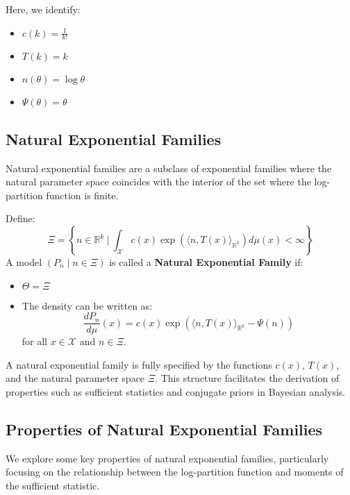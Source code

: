 \documentclass[open=any, 11pt,paper=A4]{scrreprt}
\begin{document}
Here, we identify:
\begin{itemize}
    \item \(c(k) = \frac{1}{k!}\)
    \item \(T(k) = k\)
    \item \(n(\theta) = \log \theta\)
    \item \(\Psi(\theta) = \theta\)
\end{itemize}

\subsection*{Natural Exponential Families}

Natural exponential families are a subclass of exponential families where the natural parameter space coincides with the interior of the set where the log-partition function is finite.

\begin{definition}
    Define:
    \[
    \Xi = \left\{ n \in \mathbb{R}^k \ \bigg| \ \int_{\mathcal{X}} c(x) \exp\left( \langle n, T(x) \rangle_{\mathbb{R}^k} \right) d\mu(x) < \infty \right\}
    \]
    A model \((P_n \mid n \in \Xi)\) is called a \textbf{Natural Exponential Family} if:
    \begin{itemize}
        \item \(\Theta = \Xi\)
        \item The density can be written as:
        \[
        \frac{dP_n}{d\mu}(x) = c(x) \exp\left( \langle n, T(x) \rangle_{\mathbb{R}^k} - \Psi(n) \right)
        \]
        for all \(x \in \mathcal{X}\) and \(n \in \Xi\).
    \end{itemize}
\end{definition}

\begin{remark}
    A natural exponential family is fully specified by the functions \(c(x)\), \(T(x)\), and the natural parameter space \(\Xi\). This structure facilitates the derivation of properties such as sufficient statistics and conjugate priors in Bayesian analysis.
\end{remark}

\subsection*{Properties of Natural Exponential Families}

We explore some key properties of natural exponential families, particularly focusing on the relationship between the log-partition function and moments of the sufficient statistic.
\end{document}
